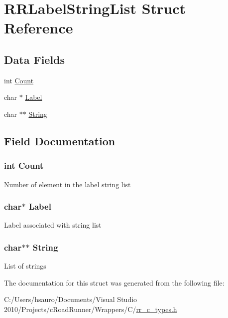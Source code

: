 \hypertarget{struct_r_r_label_string_list}{
\section{\-R\-R\-Label\-String\-List \-Struct \-Reference}
\label{struct_r_r_label_string_list}
}
\subsection*{\-Data \-Fields}
\begin{DoxyCompactItemize}
\item 
int \hyperlink{struct_r_r_label_string_list_aad462966ed963f892117056de1eba502}{\-Count}
\item 
char $\ast$ \hyperlink{struct_r_r_label_string_list_af91fd2b26f73a15052d23933bee0ed5a}{\-Label}
\item 
char $\ast$$\ast$ \hyperlink{struct_r_r_label_string_list_acdbc34377baf3e52d9044aada0f2f511}{\-String}
\end{DoxyCompactItemize}


\subsection{\-Field \-Documentation}
\hypertarget{struct_r_r_label_string_list_aad462966ed963f892117056de1eba502}{
\subsubsection[{\-Count}]{\setlength{\rightskip}{0pt plus 5cm}int {\bf \-Count}}}
\label{struct_r_r_label_string_list_aad462966ed963f892117056de1eba502}
\-Number of element in the label string list \hypertarget{struct_r_r_label_string_list_af91fd2b26f73a15052d23933bee0ed5a}{
\subsubsection[{\-Label}]{\setlength{\rightskip}{0pt plus 5cm}char$\ast$ {\bf \-Label}}}
\label{struct_r_r_label_string_list_af91fd2b26f73a15052d23933bee0ed5a}
\-Label associated with string list \hypertarget{struct_r_r_label_string_list_acdbc34377baf3e52d9044aada0f2f511}{
\subsubsection[{\-String}]{\setlength{\rightskip}{0pt plus 5cm}char$\ast$$\ast$ {\bf \-String}}}
\label{struct_r_r_label_string_list_acdbc34377baf3e52d9044aada0f2f511}
\-List of strings 

\-The documentation for this struct was generated from the following file\-:\begin{DoxyCompactItemize}
\item 
\-C\-:/\-Users/hsauro/\-Documents/\-Visual Studio 2010/\-Projects/c\-Road\-Runner/\-Wrappers/\-C/\hyperlink{rr__c__types_8h}{rr\-\_\-c\-\_\-types.\-h}\end{DoxyCompactItemize}
